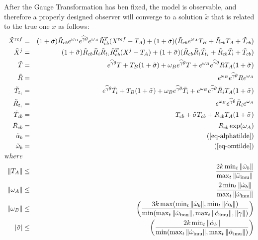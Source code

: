 After the Gauge Transformation has ben fixed, the model is observable, and therefore a properly designed observer will converge to a solution $\tilde x$ that is related to the true one $x$ as follows: 
\begin{eqnarray}
{\Xw}^{\mathrm ref} &=&   (1+\tilde  \sigma)\tilde R_{cb} e^{\w_B} e^{\widehat \gamma \theta}e^{\w_A} \tilde R_{cb}^T (X^{\mathrm ref}-T_A) +(1+\tilde \sigma)( \tilde R_{cb} e^{\w_A}T_B + \tilde R_{cb} T_A + \tilde T_{cb})  \\
{\Xw}^j &=&   (1+\tilde  \sigma)\tilde R_{cb} \bar R_i \tilde R_{t_i}  \tilde R_{cb}^T (X^{j}-T_A) +(1+\tilde \sigma)( \tilde R_{cb} \bar R_i \tilde T_{t_i} + \tilde R_{cb} \bar T_{i} + \tilde T_{cb}) \\
\tilde T %
&=& e^{\widehat \gamma \theta} T + T_B (1+\tilde\sigma) + \w_Be^{\widehat \gamma \theta} T + e^{\w_B} e^{\widehat \gamma \theta}R T_A(1+\tilde \sigma) \\
\tilde R &=&  e^{\w_B}e^{\widehat \gamma \theta} R e^{\w_A}\\
\tilde T_{t_i} &=&  e^{\widehat \gamma \theta} \bar T_{i} + T_B (1+\tilde\sigma) + \w_Be^{\widehat \gamma \theta} \bar T_{i} + e^{\w_B} e^{\widehat \gamma \theta}\bar R_{i} T_A(1+\tilde \sigma)\\
\tilde R_{t_i} &=&  e^{\w_B}e^{\widehat \gamma \theta} \bar R_{i} e^{\w_A}\\
\tilde T_{cb} &=&  T_{cb} + \tilde \sigma T_{cb} + R_{cb}T_A(1+ \tilde \sigma) \\
\tilde R_{cb} &=&  R_{cb}\exp(\w_A)\\
\tilde \alpha_b &=&  (\ref{eq-alphatilde}) \nonumber  \\
\tilde \w_b &=& (\ref{eq-omtilde}) \nonumber \\
{\mathrm where} & &  \nonumber \\
\| T_A \| &\le& \frac{2 k \min_t \| \dot \w_b \| }{\max_t \| \ddot \w\imu  \|}  \nonumber \\
\| \w_A \| &\le& \frac{2 \min_t \| \dot \w_b \|}{\max_t \| \dot \w\imu  \|} \nonumber  \\
 \| \w_B \| &\le& \left(\frac{3k\max(\min_t \|\dot \w_b\|, \min_t \|\dot \alpha_b\| )}{\min(\max_t \| \dot \w\imu  \|, \max_t \| \dot \alpha\imu  \|, \| \gamma \|)}\right) \nonumber \\
| \tilde \sigma | &\le& \left(\frac{2k\min_t \| \dot \alpha_b \|}{\min(\max_t \| \dot \w\imu  \|, \max_t \| \dot \alpha\imu  \|)}\right) \nonumber
\end{eqnarray}
